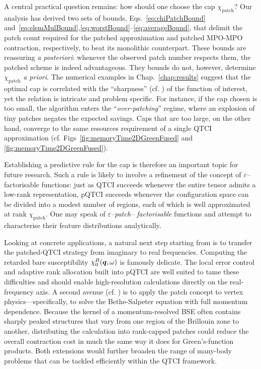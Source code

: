 A central practical question remains: how should one choose the cap
\(\chi_{\text{patch}}\)?  Our analysis has derived two sets of bounds, Eqs.~\eqref{eq:chiPatchBound} and~\eqref{eq:elemMulBound},\eqref{eq:worstBound}--\eqref{eq:averageBound}, that delimit the patch count required for the patched approximation and patched MPO-MPO contraction, respectively, to beat its monolithic counterpart.  These bounds are reassuring \emph{a
posteriori}: whenever the observed patch
number respects them, the patched scheme is indeed advantageous.
They bounds do not, however, determine \(\chi_{\text{patch}}\) \emph{a priori}. The numerical examples in Chap.~\ref{chap:results} suggest that the optimal cap is correlated with the ``sharpness'' (cf. ) of the function of interest, yet the relation is intricate and problem specific. For instance, if
the cap chosen is too small, the algorithm enters the ``\emph{over-patching}'' regime, where an explosion of tiny patches negates the
expected savings. Caps that are too large, on the other hand, converge to the same resources requirement of a single QTCI approximation (cf. Figs~\ref{fig:memoryTime2DGreenFused} and \ref{fig:memoryTime2DGreenFused}).

Establishing a predictive rule for the cap is therefore an important topic for future research.  Such a rule is likely to involve a refinement of the concept of $\varepsilon$–factorisable functions: just as
QTCI succeeds whenever the entire tensor admits a low-rank representation, pQTCI succeeds whenever the configuration space can be divided into a modest number of regions, each of which is well approximated at rank \(\chi_{\text{patch}}\). One may speak of \emph{$\varepsilon$–patch–
factorisable} functions and attempt to characterise their feature distributions analytically.

Looking at concrete applications, a natural next step starting from  is to transfer the patched-QTCI strategy from imaginary to real frequencies. Computing the retarded bare susceptibility $\chi^R_0(\boldsymbol{q},\omega)$ is famously delicate. The local error control and adaptive rank allocation built into pQTCI are well suited to tame these difficulties and should enable high-resolution calculations directly on the real-frequency axis. A second avenue (cf. ) is to apply the patch concept to vertex physics—specifically, to solve the Bethe-Salpeter equation with full momentum dependence. Because the kernel of a momentum-resolved BSE often contains sharply peaked structures that vary from one region of the Brillouin zone to another, distributing the calculation into rank-capped patches could reduce the overall contraction cost in much the same way it does for Green's-function products. Both extensions would further broaden the range of many-body problems that can be tackled efficiently within the QTCI framework.

